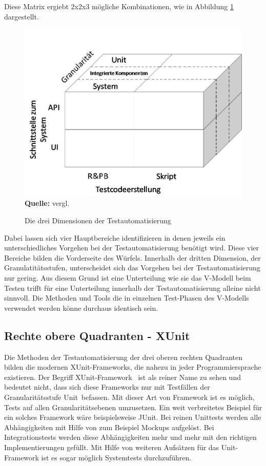 Diese Matrix ergiebt 2x2x3 mögliche Kombinationen, wie in Abbildung \ref{fig:3DimensionenDerTestauto} dargestellt.

\begin{figure}[htb]
  \centering  
  \includegraphics[scale=0.5]{img/methodenTestauto.jpg}\\
  \footnotesize\sffamily\textbf{Quelle:} vergl. \cite{meszaros_agile_2003}
  \caption{Die drei Dimensionen der Testautomatisierung}
  \label{fig:3DimensionenDerTestauto}
\end{figure}

Dabei lassen sich vier Hauptbereiche identifizieren in denen jeweils ein unterschiedliches Vorgehen bei der Testautomatisierung benötigt wird. Diese vier Bereiche bilden die Vorderseite des Würfels. Innerhalb der dritten Dimension, der Granulatitätsstufen, unterscheidet sich das Vorgehen bei der Testautomatisierung nur gering. Aus diesem Grund ist eine Unterteilung wie sie das V-Modell beim Testen trifft für eine Unterteilung innerhalb der Testautomatisierung alleine nicht sinnvoll. Die Methoden und Tools die in einzelnen Test-Phasen des V-Modells verwendet werden könne durchaus identisch sein.

\subsection{Rechte obere Quadranten - XUnit}
Die Methoden der Testautomatisierung der drei oberen rechten Quadranten bilden die modernen \glqq XUnit-Frameworks\grqq , die nahezu in jeder Programmiersprache existieren. Der Begriff \glqq XUnit-Framework \grqq\ ist als reiner Name zu sehen und bedeutet nicht, dass sich diese Frameworks nur mit Testfällen der Granularitätsstufe \glqq Unit\grqq\ befassen. Mit dieser Art von Framework ist es möglich, Tests auf allen Granularitätsebenen umzusetzen. Ein weit verbreitetes Beispiel für ein solches Framework wäre beispielsweise JUnit. Bei reinen Unittests werden alle Abhängigkeiten mit Hilfe von zum Beispiel Mockups aufgelöst. Bei Integrationstests werden diese Abhängigkeiten mehr und mehr mit den richtigen Implementierungen gefüllt. Mit Hilfe von weiteren Aufsätzen für das Unit-Framework ist es sogar möglich Systemtests durchzuführen.  

